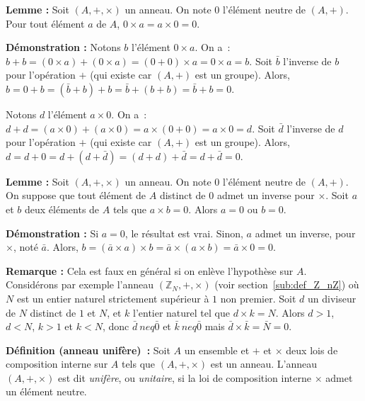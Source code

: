 \noindent\textbf{Lemme :} Soit $(A, +, \times)$ un anneau. 
On note $0$ l'élément neutre de $(A, +)$.
Pour tout élément $a$ de $A$, $0 \times a = a \times 0 = 0$.

\medskip

\noindent\textbf{Démonstration :} 
    Notons $b$ l'élément $0 \times a$. 
    On a : $b + b = (0 \times a) + (0 \times a) = (0 + 0) \times a = 0 \times a = b$.
    Soit $\bar{b}$ l'inverse de $b$ pour l'opération $+$ (qui existe car $(A, +)$ est un groupe).
    Alors, $b = 0 + b = (\bar{b} + b) + b = \bar{b} + (b + b) = \bar{b} + b = 0$. 

    Notons $d$ l'élément $a \times 0$. 
    On a : $d + d = (a \times 0) + (a \times 0) = a \times (0 + 0) = a \times 0 = d$.
    Soit $\bar{d}$ l'inverse de $d$ pour l'opération $+$ (qui existe car $(A, +)$ est un groupe).
    Alors, $d = d + 0 = d + (d + \bar{d}) = (d + d) + \bar{d} = d + \bar{d} = 0$. 

    \done

\medskip

\noindent\textbf{Lemme :} Soit $(A, +, \times)$ un anneau. 
On note $0$ l'élément neutre de $(A, +)$.
On suppose que tout élément de $A$ distinct de $0$ admet un inverse pour $\times$.
Soit $a$ et $b$ deux éléments de $A$ tels que $a \times b = 0$.
Alors $a = 0$ ou $b = 0$.

\medskip

\noindent\textbf{Démonstration :} Si $a = 0$, le résultat est vrai.
Sinon, $a$ admet un inverse, pour $\times$, noté $\bar{a}$.
Alors, $b = (\bar{a} \times a) \times b = \bar{a} \times (a \times b) = \bar{a} \times 0 = 0$.

\done

\noindent\textbf{Remarque :} Cela est faux en général si on enlève l'hypothèse sur $A$. 
Considérons par exemple l'anneau $(\mathbb{Z}_N, +, \times)$ (voir section~\ref{sub:def_Z_nZ}) où $N$ est un entier naturel strictement supérieur à $1$ non premier. 
Soit $d$ un diviseur de $N$ distinct de $1$ et $N$, et $k$ l'entier naturel tel que $d \times k = N$. 
Alors $d > 1$, $d < N$, $k > 1$ et $k < N$, donc $\bar{d} \ neq \bar{0}$ et $\bar{k} \ neq \bar{0}$ mais $\bar{d} \times \bar{k} = \bar{N} = 0$.

\medskip

\noindent\textbf{Définition (anneau unifère) :} Soit $A$ un ensemble et $+$ et $\times$ deux lois de composition interne sur $A$ tels que $(A, +, \times)$ est un anneau. 
    L'anneau $(A, +, \times)$ est dit \textit{unifère}, ou \textit{unitaire}, si la loi de composition interne $\times$ admet un élément neutre.

